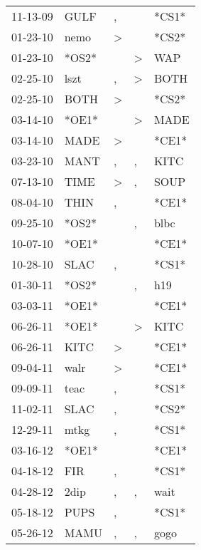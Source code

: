 \begin{supertabular}{lllll}
 11-13-09 &   GULF &             , &               &  *CS1* \\
 01-23-10 &   nemo &  \textgreater &               &  *CS2* \\
 01-23-10 &  *OS2* &               &  \textgreater &    WAP \\
 02-25-10 &   lszt &             , &  \textgreater &   BOTH \\
 02-25-10 &   BOTH &  \textgreater &               &  *CS2* \\
 03-14-10 &  *OE1* &               &  \textgreater &   MADE \\
 03-14-10 &   MADE &  \textgreater &               &  *CE1* \\
 03-23-10 &   MANT &             , &             , &   KITC \\
 07-13-10 &   TIME &  \textgreater &             , &   SOUP \\
 08-04-10 &   THIN &             , &               &  *CE1* \\
 09-25-10 &  *OS2* &               &             , &   blbc \\
 10-07-10 &  *OE1* &               &               &  *CE1* \\
 10-28-10 &   SLAC &             , &               &  *CS1* \\
 01-30-11 &  *OS2* &               &             , &    h19 \\
 03-03-11 &  *OE1* &               &               &  *CE1* \\
 06-26-11 &  *OE1* &               &  \textgreater &   KITC \\
 06-26-11 &   KITC &  \textgreater &               &  *CE1* \\
 09-04-11 &   walr &  \textgreater &               &  *CE1* \\
 09-09-11 &   teac &             , &               &  *CS1* \\
 11-02-11 &   SLAC &             , &               &  *CS2* \\
 12-29-11 &   mtkg &             , &               &  *CS1* \\
 03-16-12 &  *OE1* &               &               &  *CE1* \\
 04-18-12 &    FIR &             , &               &  *CS1* \\
 04-28-12 &   2dip &             , &             , &   wait \\
 05-18-12 &   PUPS &             , &               &  *CS1* \\
 05-26-12 &   MAMU &             , &             , &   gogo \\

\end{supertabular}
